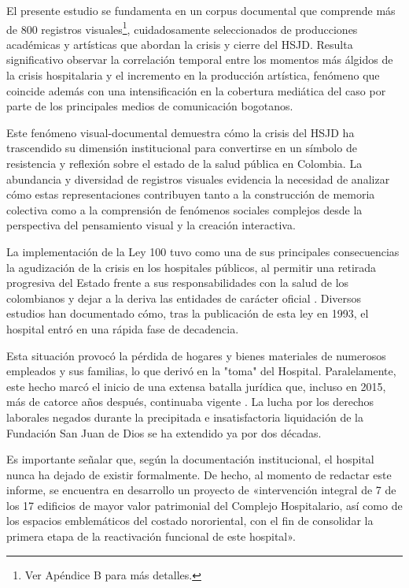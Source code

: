 El presente estudio se fundamenta en un corpus documental que comprende más de 800 registros visuales\footnote{Ver Apéndice B para más detalles.}, cuidadosamente seleccionados de producciones académicas y artísticas que abordan la crisis y cierre del HSJD. Resulta significativo observar la correlación temporal entre los momentos más álgidos de la crisis hospitalaria y el incremento en la producción artística, fenómeno que coincide además con una intensificación en la cobertura mediática del caso por parte de los principales medios de comunicación bogotanos.

Este fenómeno visual-documental demuestra cómo la crisis del HSJD ha trascendido su dimensión institucional para convertirse en un símbolo de resistencia y reflexión sobre el estado de la salud pública en Colombia. La abundancia y diversidad de registros visuales evidencia la necesidad de analizar cómo estas representaciones contribuyen tanto a la construcción de memoria colectiva como a la comprensión de fenómenos sociales complejos desde la perspectiva del pensamiento visual y la creación interactiva.

La implementación de la Ley 100 tuvo como una de sus principales consecuencias la agudización de la crisis en los hospitales públicos, al permitir una retirada progresiva del Estado frente a sus responsabilidades con la salud de los colombianos y dejar a la deriva las entidades de carácter oficial \parencite{Castiblanco2017}. Diversos estudios han documentado cómo, tras la publicación de esta ley en 1993, el hospital entró en una rápida fase de decadencia.

Esta situación provocó la pérdida de hogares y bienes materiales de numerosos empleados y sus familias, lo que derivó en la "toma" del Hospital. Paralelamente, este hecho marcó el inicio de una extensa batalla jurídica que, incluso en 2015, más de catorce años después, continuaba vigente \parencite{Orlando2015}. La lucha por los derechos laborales negados durante la precipitada e insatisfactoria liquidación de la Fundación San Juan de Dios se ha extendido ya por dos décadas.

Es importante señalar que, según la documentación institucional, el hospital nunca ha dejado de existir formalmente. De hecho, al momento de redactar este informe, se encuentra en desarrollo un proyecto de «intervención integral de 7 de los 17 edificios de mayor valor patrimonial del Complejo Hospitalario, así como de los espacios emblemáticos del costado nororiental, con el fin de consolidar la primera etapa de la reactivación funcional de este hospital».